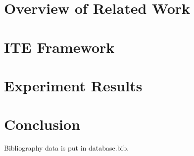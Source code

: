 \section{Overview of Related Work}
\label{sec:ite_overview}


\section{ITE Framework}
\label{sec:ite_model}

\section{Experiment Results}
\label{sec:ite_res}

\section{Conclusion}
\label{sec:ite_conclusion}

Bibliography data is put in database.bib.

\chapterend